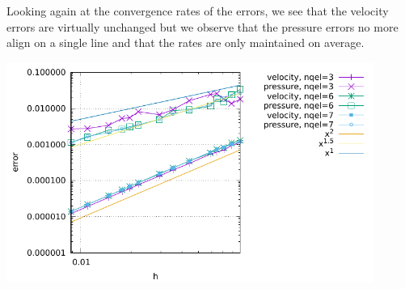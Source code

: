Looking again at the convergence rates of the errors, we see that the velocity errors 
are virtually unchanged but we observe that the pressure errors no more align on a
single line and that the rates are only maintained on average. 

\begin{center}
\includegraphics[width=12cm]{python_codes/fieldstone_47/images/rand/errors}
\end{center}

